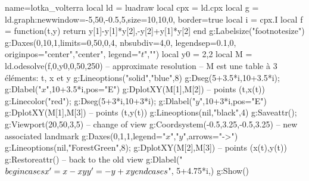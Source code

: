 \begin{luadraw}{name=lotka_volterra}
local ld = luadraw
local cpx = ld.cpx
local g = ld.graph:new{window={-5,50,-0.5,5},size={10,10,0}, border=true}
local i = cpx.I
local f = function(t,y) return {y[1]-y[1]*y[2],-y[2]+y[1]*y[2]} end
g:Labelsize("footnotesize")
g:Daxes({0,10,1},{limits={{0,50},{0,4}}, nbsubdiv={4,0}, legendsep={0.1,0},
originpos={"center","center"}, legend={"$t$",""}})
local y0 = {2,2}
local M = ld.odesolve(f,0,y0,0,50,250) -- approximate resolution
-- M est une table à 3 éléments: t, x et y
g:Lineoptions("solid","blue",8)
g:Dseg({5+3.5*i,10+3.5*i}); g:Dlabel("$x$",10+3.5*i,{pos="E"})
g:DplotXY(M[1],M[2]) -- points (t,x(t))
g:Linecolor("red"); g:Dseg({5+3*i,10+3*i}); g:Dlabel("$y$",10+3*i,{pos="E"})
g:DplotXY(M[1],M[3]) -- points (t,y(t))
g:Lineoptions(nil,"black",4)
g:Saveattr(); g:Viewport(20,50,3,5) -- change of view
g:Coordsystem(-0.5,3.25,-0.5,3.25) -- new associated landmark
g:Daxes({0,1,1},{legend={"$x$","$y$"},arrows="->"})
g:Lineoptions(nil,"ForestGreen",8); g:DplotXY(M[2],M[3]) -- points (x(t),y(t))
g:Restoreattr() -- back to the old view
g:Dlabel("$\\begin{cases}x'=x-xy\\\\y'=-y+xy\\end{cases}$", 5+4.75*i,{})
g:Show()
\end{luadraw}
